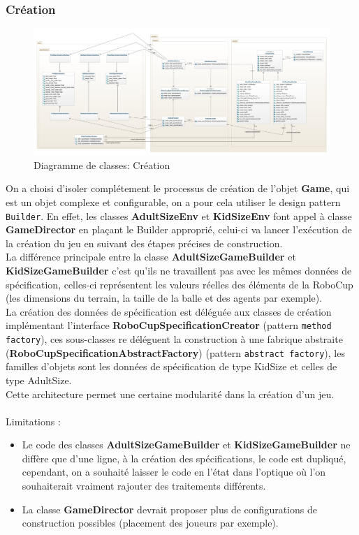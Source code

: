 \documentclass[11pt, a4paper]{article}
\begin{document}
	\subsubsection{Création}

	\begin{figure}[H]
		\centering
		\includegraphics[scale=0.26]{images/robocup-creation.png}
		\caption {Diagramme de classes: Création  }
	\end{figure}

	On a choisi d'isoler complétement le processus de création de l'objet \textbf{Game}, qui est un objet complexe et configurable, on a pour cela
	utiliser le design pattern \texttt{Builder}. En effet, les classes \textbf{AdultSizeEnv} et \textbf{KidSizeEnv} font appel à classe \textbf{GameDirector} en plaçant le Builder approprié, celui-ci va lancer l'exécution de la création du jeu en suivant des étapes précises de construction. \\
	La différence principale entre la classe \textbf{AdultSizeGameBuilder} et \textbf{KidSizeGameBuilder} c'est qu'ils ne travaillent pas avec les mêmes données de spécification, celles-ci représentent les valeurs réelles des éléments de la RoboCup (les dimensions du terrain, la taille de la balle et des agents par exemple). \\ La création des données de spécification est déléguée aux classes de création implémentant l'interface \textbf{RoboCupSpecificationCreator} (pattern \texttt{method factory}), ces sous-classes re déléguent la construction à une fabrique abstraite (\textbf{RoboCupSpecificationAbstractFactory}) (pattern \texttt{abstract factory}), les familles d'objets sont les données de spécification de type KidSize et celles de type AdultSize. \\
	Cette architecture permet une certaine modularité dans la création d'un jeu. \\
	\\
	\noindent Limitations : \\
	\begin{itemize}
		\item Le code des classes \textbf{AdultSizeGameBuilder} et \textbf{KidSizeGameBuilder} ne diffère que d'une ligne, à la création des spécifications, le code est dupliqué, cependant, on a souhaité laisser le code en l'état dans l'optique où l'on souhaiterait vraiment rajouter des traitements différents.
		\item La classe \textbf{GameDirector} devrait proposer plus de configurations de construction possibles (placement des joueurs par exemple).
	\end{itemize}
\end{document}
